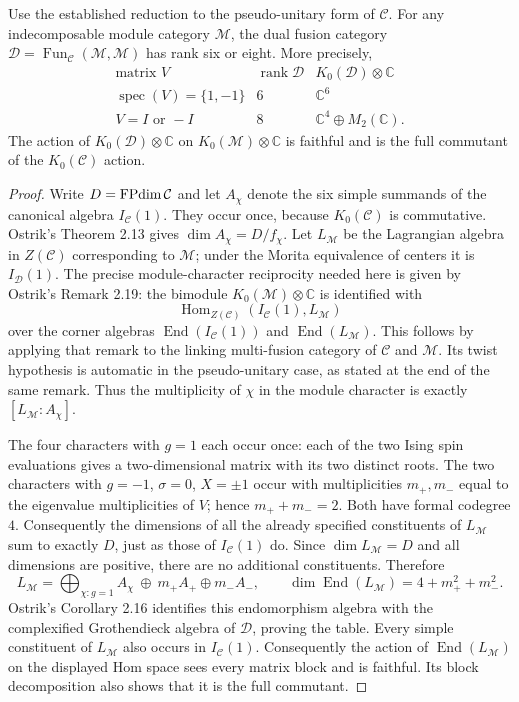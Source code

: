 \begin{theorem}
Use the established reduction to the pseudo-unitary form of $\mathcal C$.
For any indecomposable module category $\mathcal M$, the dual fusion category
$\mathcal D=\operatorname{Fun}_{\mathcal C}(\mathcal M,\mathcal M)$ has rank six or eight.
More precisely,
\[
\begin{array}{c|c|c}
\text{matrix }V&\operatorname{rank}\mathcal D&
K_0(\mathcal D)\otimes\mathbb C\\\hline
\operatorname{spec}(V)=\{1,-1\}&6&\mathbb C^6\\
V=I\text{ or }-I&8&\mathbb C^4\oplus M_2(\mathbb C).
\end{array}
\]
The action of $K_0(\mathcal D)\otimes\mathbb C$ on
$K_0(\mathcal M)\otimes\mathbb C$ is faithful and is the full commutant of
the $K_0(\mathcal C)$ action.
\end{theorem}
\begin{proof}
Write $D=\operatorname{FPdim}\mathcal C$ and let $A_\chi$ denote the six simple summands
of the canonical algebra $I_{\mathcal C}(1)$. They occur once, because
$K_0(\mathcal C)$ is commutative. Ostrik's Theorem 2.13 gives
$\dim A_\chi=D/f_\chi$.
Let $L_\mathcal M$ be the Lagrangian algebra in $Z(\mathcal C)$ corresponding to
$\mathcal M$; under the Morita equivalence of centers it is $I_{\mathcal D}(1)$.
The precise module-character reciprocity needed here is given by
Ostrik's Remark 2.19: the bimodule $K_0(\mathcal M)\otimes\mathbb C$ is
identified with
\[
\operatorname{Hom}_{Z(\mathcal C)}(I_{\mathcal C}(1),L_\mathcal M)
\]
over the corner algebras $\operatorname{End}(I_{\mathcal C}(1))$ and
$\operatorname{End}(L_\mathcal M)$. This follows by applying that remark to
the linking multi-fusion category of $\mathcal C$ and $\mathcal M$.
Its twist hypothesis is automatic in the pseudo-unitary case, as stated
at the end of the same remark. Thus the multiplicity of $\chi$ in the
module character is exactly $[L_\mathcal M:A_\chi]$.

The four characters with $g=1$ each occur once: each of the two Ising
spin evaluations gives a two-dimensional matrix with its two distinct
roots. The two characters with $g=-1$, $\sigma=0$, $X=\pm1$ occur
with multiplicities $m_+,m_-$ equal to the eigenvalue multiplicities of
$V$; hence $m_++m_-=2$. Both have formal codegree $4$. Consequently
the dimensions of all the already specified constituents of $L_\mathcal M$ sum
to exactly $D$, just as those of $I_{\mathcal C}(1)$ do. Since
$\dim L_\mathcal M=D$ and all dimensions are positive, there are no additional
constituents. Therefore
\[
L_\mathcal M=\bigoplus_{\chi:g=1}A_\chi\ \oplus\ m_+A_+\oplus m_-A_-,
\qquad
\dim\operatorname{End}(L_\mathcal M)=4+m_+^2+m_-^2.
\]
Ostrik's Corollary 2.16 identifies this endomorphism algebra with the
complexified Grothendieck algebra of $\mathcal D$, proving the table.
Every simple constituent of $L_\mathcal M$ also occurs in $I_{\mathcal C}(1)$.
Consequently the action of $\operatorname{End}(L_\mathcal M)$ on the displayed
Hom space sees every matrix block and is faithful. Its block
decomposition also shows that it is the full commutant.
\end{proof}

